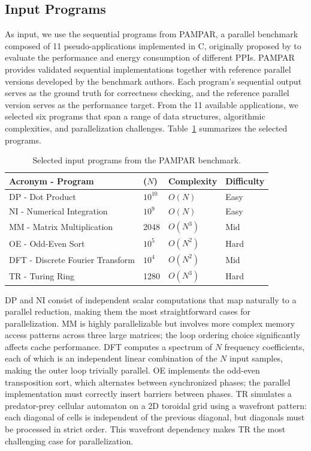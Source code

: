 \documentclass[conference]{IEEEtran}
\begin{document}
\subsection{Input Programs} \label{sec:programs}

As input, we use the sequential programs from PAMPAR, a parallel benchmark composed of 11 pseudo-applications implemented in C, originally proposed by \cite{GARCIA:PAMPAR:2020} to evaluate the performance and energy consumption of different PPIs.
PAMPAR provides validated sequential implementations together with reference parallel versions developed by the benchmark authors.
Each program's sequential output serves as the ground truth for correctness checking, and the reference parallel version serves as the performance target.
%
From the 11 available applications, we selected six programs that span a range of data structures, algorithmic complexities, and parallelization challenges.
Table~\ref{tab:programs} summarizes the selected programs.

\begin{table}[tbp]
\centering
\caption{Selected input programs from the PAMPAR benchmark.}
\label{tab:programs}
\begin{tabular}{llll}
\toprule
\textbf{Acronym} - \textbf{Program} & \textbf{($N$)} & \textbf{Complexity} & \textbf{Difficulty} \\
\midrule
DP - Dot Product                & $10^{10}$  & $O(N)$   & Easy   \\
NI - Numerical Integration      & $10^{9}$   & $O(N)$   & Easy   \\
MM - Matrix Multiplication      & 2048       & $O(N^3)$ & Mid \\ %
OE - Odd-Even Sort              & $10^{5}$   & $O(N^2)$ & Hard   \\
DFT - Discrete Fourier Transform & $10^{4}$  & $O(N^2)$ & Mid \\ %
TR - Turing Ring                & 1280       & $O(N^3)$ & Hard   \\
\bottomrule
\end{tabular}
\end{table}

DP and NI consist of independent scalar computations that map naturally to a parallel reduction, making them the most straightforward cases for parallelization.
MM is highly parallelizable but involves more complex memory access patterns across three large matrices; the loop ordering choice significantly affects cache performance. 
DFT computes a spectrum of $N$ frequency coefficients, each of which is an independent linear combination of the $N$ input samples, making the outer loop trivially parallel.
OE implements the odd-even transposition sort, which alternates between synchronized phases; the parallel implementation must correctly insert barriers between phases.
TR simulates a predator-prey cellular automaton on a 2D toroidal grid using a wavefront pattern: each diagonal of cells is independent of the previous diagonal, but diagonals must be processed in strict order.
This wavefront dependency makes TR the most challenging case for parallelization.
\end{document}
